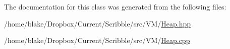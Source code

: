 The documentation for this class was generated from the following files\-:\begin{DoxyCompactItemize}
\item 
/home/blake/\-Dropbox/\-Current/\-Scribble/src/\-V\-M/\hyperlink{_heap_8hpp}{Heap.\-hpp}\item 
/home/blake/\-Dropbox/\-Current/\-Scribble/src/\-V\-M/\hyperlink{_heap_8cpp}{Heap.\-cpp}\end{DoxyCompactItemize}
